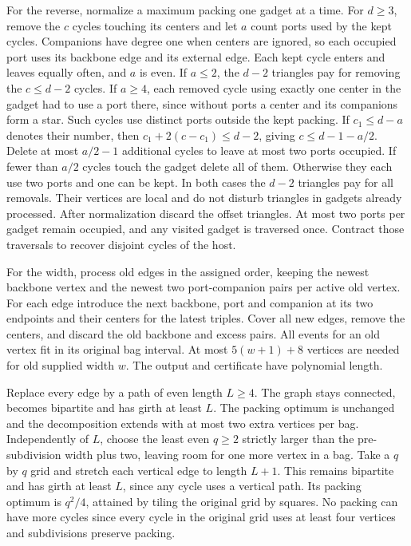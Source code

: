 \documentclass[11pt]{article}
\begin{document}
For the reverse, normalize a maximum packing one gadget at a time.
For \(d\ge3\), remove the \(c\) cycles touching its centers and let
\(a\) count ports used by the kept cycles. Companions have degree
one when centers are ignored, so each occupied port uses its
backbone edge and its external edge. Each kept cycle enters and
leaves equally often, and \(a\) is even. If \(a\le2\), the \(d-2\)
triangles pay for removing the \(c\le d-2\) cycles.
If \(a\ge4\), each removed cycle using exactly one center in the
gadget had to use a port there, since without ports a center and
its companions form a star. Such cycles use distinct ports outside
the kept packing. If \(c_1\le d-a\) denotes their number,
then \(c_1+2(c-c_1)\le d-2\), giving \(c\le d-1-a/2\).
Delete at most \(a/2-1\) additional cycles to leave at most two
ports occupied. If fewer than \(a/2\) cycles touch the gadget
delete all of them. Otherwise they each use two ports and one
can be kept. In both cases the \(d-2\) triangles pay for
all removals. Their vertices are local and do not disturb
triangles in gadgets already processed. After normalization
discard the offset triangles. At most two ports per gadget
remain occupied, and any visited gadget is traversed once.
Contract those traversals to recover disjoint cycles of the host.

For the width, process old edges in the assigned order, keeping
the newest backbone vertex and the newest two port-companion
pairs per active old vertex. For each edge introduce the next
backbone, port and companion at its two endpoints and their
centers for the latest triples. Cover all new edges, remove the
centers, and discard the old backbone and excess pairs.
All events for an old vertex fit in its original bag interval.
At most \(5(w+1)+8\) vertices are needed for old supplied width
\(w\). The output and certificate have polynomial length.


Replace every edge by a path of even length \(L\ge4\).
The graph stays connected, becomes bipartite and has girth
at least \(L\). The packing optimum is unchanged and the
decomposition extends with at most two extra vertices per bag.
Independently of \(L\), choose the least even \(q\ge2\) strictly larger
than the pre-subdivision width plus two, leaving
room for one more vertex in a bag. Take a \(q\) by \(q\) grid
and stretch each vertical edge to length \(L+1\). This remains
bipartite and has girth at least \(L\), since any cycle uses a
vertical path. Its packing optimum is \(q^2/4\), attained by
tiling the original grid by squares. No packing can have more
cycles since every cycle in the original grid uses at least
four vertices and subdivisions preserve packing.
\end{document}
